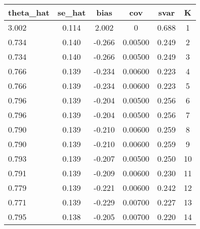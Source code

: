 \documentclass[]{article}
\begin{document}
\begin{tabular}{lccccc} \hline
theta\_hat & se\_hat & bias & cov & svar & K \\ \hline
3.002 & 0.114 & 2.002 & 0 & 0.688 & 1 \\
0.734 & 0.140 & -0.266 & 0.00500 & 0.249 & 2 \\
0.734 & 0.140 & -0.266 & 0.00500 & 0.249 & 3 \\
0.766 & 0.139 & -0.234 & 0.00600 & 0.223 & 4 \\
0.766 & 0.139 & -0.234 & 0.00600 & 0.223 & 5 \\
0.796 & 0.139 & -0.204 & 0.00500 & 0.256 & 6 \\
0.796 & 0.139 & -0.204 & 0.00500 & 0.256 & 7 \\
0.790 & 0.139 & -0.210 & 0.00600 & 0.259 & 8 \\
0.790 & 0.139 & -0.210 & 0.00600 & 0.259 & 9 \\
0.793 & 0.139 & -0.207 & 0.00500 & 0.250 & 10 \\
0.791 & 0.139 & -0.209 & 0.00600 & 0.230 & 11 \\
0.779 & 0.139 & -0.221 & 0.00600 & 0.242 & 12 \\
0.771 & 0.139 & -0.229 & 0.00700 & 0.227 & 13 \\
 0.795 & 0.138 & -0.205 & 0.00700 & 0.220 & 14 \\ \hline
\end{tabular}
\end{document}
